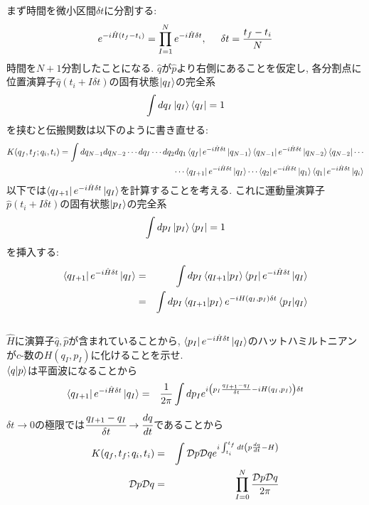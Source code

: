 \documentclass[10.5pt,a4paper]{jreport}
\begin{document}
まず時間を微小区間$\delta t$に分割する:
\begin{eqnarray}
  e^{-i\hat{H}(t_f-t_i)} = \prod_{I=1}^Ne^{-i\hat{H}\delta t},\hspace{0.5cm} \delta t = \frac{t_f - t_i}{N}
\end{eqnarray}
時間を$N+1$分割したことになる. $\hat{q}$が$\hat{p}$より右側にあることを仮定し, 各分割点に位置演算子$\hat{q}(t_i + I\delta t)$の固有状態$\ket{q_I}$の完全系
\begin{eqnarray}
  \int dq_I \ket{q_I}\bra{q_I} = 1
\end{eqnarray}
を挟むと伝搬関数は以下のように書き直せる:
\begin{eqnarray}
\nonumber  K(q_f, t_f;q_i, t_i) =\int dq_{N-1}dq_{N-2}\cdots dq_{I}\cdots dq_2dq_1\bra{q_f}e^{-i\hat{H}\delta t}\ket{q_{N-1}}\bra{q_{N-1}}e^{-i\hat{H}\delta t}\ket{q_{N-2}}\bra{q_{N-2}}\cdots\\
  \cdots\bra{q_{I+1}}e^{-i\hat{H}\delta t}\ket{q_{I}}\cdots\bra{q_2}e^{-i\hat{H}\delta t}\ket{q_1}\bra{q_1}e^{-i\hat{H}\delta t}\ket{q_i}
\end{eqnarray}
以下では$\bra{q_{I+1}}e^{-i\hat{H}\delta t}\ket{q_{I}}$を計算することを考える. これに運動量演算子$\hat{p}(t_i + I\delta t)$の固有状態$\ket{p_I}$の完全系
\begin{eqnarray}
  \int dp_I \ket{p_I}\bra{p_I} = 1
\end{eqnarray}
を挿入する:
\begin{eqnarray}
  \bra{q_{I+1}}e^{-i\hat{H}\delta t}\ket{q_{I}} &=& \int dp_I\bra{q_{I+1}}\ket{p_I}\bra{p_I}e^{-i\hat{H}\delta t}\ket{q_{I}}\\
  &=&\int dp_I\bra{q_{I+1}}\ket{p_I}e^{-iH(q_I, p_I)\delta t}\bra{p_I}\ket{q_{I}}
\end{eqnarray}\\

 $\hat{H}$に演算子$\hat{q}, \hat{p}$が含まれていることから, $\bra{p_I}e^{-i\hat{H}\delta t}\ket{q_{I}}$のハットハミルトニアンが$c$-数の$H(q_I, p_I)$に化けることを示せ.\\

$\bra{q}\ket{p}$は平面波になることから
\begin{eqnarray}
  \bra{q_{I+1}}e^{-i\hat{H}\delta t}\ket{q_{I}} &=& \frac{1}{2\pi}\int dp_Ie^{i\qty(p_I\frac{q_{I+1}-q_I}{\delta t}-iH(q_I, p_I)){\delta t}}
\end{eqnarray}
$\delta t \rightarrow 0$の極限では$\cfrac{q_{I+1}-q_I}{\delta t}\rightarrow \cfrac{dq}{dt}$であることから
\begin{eqnarray}
  K(q_f, t_f;q_i, t_i) &=& \int {\cal D}p{\cal D}qe^{i\int_{t_i}^{t_f}dt\qty(p\frac{dq}{dt} - H)}\\
  {\cal D}p{\cal D}q &=& \prod_{I=0}^{N}\frac{{\cal D}p{\cal D}q}{2\pi}
\end{eqnarray}\\
\end{document}
